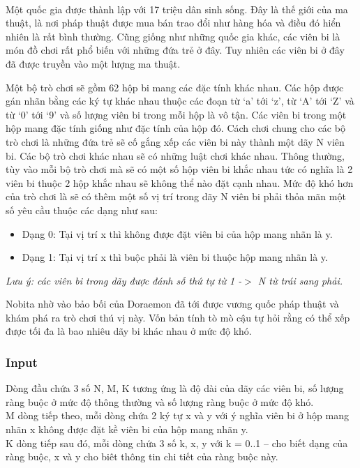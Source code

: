 

 

Một quốc gia được thành lập với 17 triệu dân sinh sống. Đây là thế giới của ma thuật, là nơi pháp thuật được mua bán trao đổi như hàng hóa và điều đó hiển nhiên là rất bình thường. Cũng giống như những quốc gia khác, các viên bi là món đồ chơi rất phổ biến với những đứa trẻ ở đây. Tuy nhiên các viên bi ở đây đã được truyền vào một lượng ma thuật.

Một bộ trò chơi sẽ gồm 62 hộp bi mang các đặc tính khác nhau. Các hộp được gán nhãn bằng các ký tự khác nhau thuộc các đoạn từ ‘a’ tới ‘z’, từ ‘A’ tới ‘Z’ và từ ‘0’ tới ‘9’ và số lượng viên bi trong mỗi hộp là vô tận. Các viên bi trong một hộp mang đặc tính giống như đặc tính của hộp đó. Cách chơi chung cho các bộ trò chơi là những đứa trẻ sẽ cố gắng xếp các viên bi này thành một dãy N viên bi. Các bộ trò chơi khác nhau sẽ có những luật chơi khác nhau. Thông thường, tùy vào mỗi bộ trò chơi mà sẽ có một số hộp viên bi khắc nhau tức có nghĩa là 2 viên bi thuộc 2 hộp khắc nhau sẽ không thể nào đặt cạnh nhau. Mức độ khó hơn của trò chơi là sẽ có thêm một số vị trí trong dãy N viên bi phải thỏa mãn một số yêu cầu thuộc các dạng như sau:
\begin{itemize}
	\item Dạng 0: Tại vị trí x thì không được đặt viên bi của hộp mang nhãn là y.
	\item Dạng 1: Tại vị trí x thì buộc phải là viên bi thuộc hộp mang nhãn là y.
\end{itemize}

\emph{Lưu ý: các viên bi trong dãy được đánh số thứ tự từ 1 -$>$ N từ trái sang phải. }

Nobita nhờ vào bảo bối của Doraemon đã tới được vương quốc pháp thuật và khám phá ra trò chơi thú vị này. Vốn bản tính tò mò cậu tự hỏi rằng có thể xếp được tối đa là bao nhiêu dãy bi khác nhau ở mức độ khó.

\subsubsection{\textbf{Input }}

Dòng đầu chứa 3 số N, M, K tương ứng là độ dài của dãy các viên bi, số lượng ràng buộc ở mức độ thông thường và số lượng ràng buộc ở mức độ khó.
\\M dòng tiếp theo, mỗi dòng chứa 2 ký tự x và y với ý nghĩa viên bi ở hộp mang nhãn x không được đặt kề viên bi của hộp mang nhãn y.
\\K dòng tiếp sau đó, mỗi dòng chứa 3 số k, x, y với k = 0..1 – cho biết dạng của ràng buộc, x và y cho biêt thông tin chi tiết của ràng buộc này.

